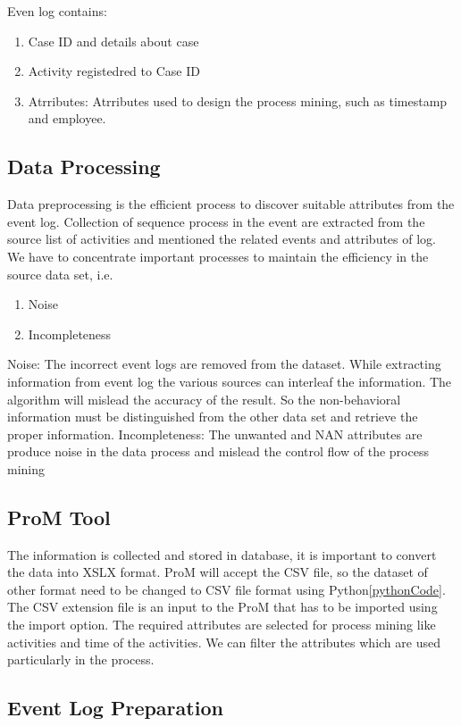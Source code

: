 Even log contains:
\begin{enumerate}
    \item Case ID and details about case
    \item Activity registedred to Case ID
    \item Atrributes: Atrributes used to design the process mining, such as timestamp and employee.
\end{enumerate}

\subsection{Data Processing}
Data preprocessing is the efficient process to discover suitable attributes from the event log. Collection of sequence process in the event are extracted from the source list of activities and mentioned the related events and attributes of log. We have to concentrate important processes to maintain the efficiency in the source data set, i.e.
\begin{enumerate}
    \item Noise
    \item Incompleteness
\end{enumerate}

Noise: The incorrect event logs are removed from the dataset.
While extracting information from event log the various
sources can interleaf the information. The algorithm will
mislead the accuracy of the result. So the non-behavioral
information must be distinguished from the other data set and
retrieve the proper information.
Incompleteness: The unwanted and NAN attributes are produce noise in
the data process and mislead the control flow of the process
mining

\subsection{ProM Tool}
The information is collected and stored in database, it is
important to convert the data into XSLX format. ProM will accept the CSV file, so the dataset
of other format need to be changed to CSV file format using Python\ref{pythonCode}. The
CSV extension file is an input to the ProM that has to be
imported using the import option. The required attributes are
selected for process mining like activities and time of the
activities. We can filter the attributes which are used
particularly in the process.

\subsection{Event Log Preparation}

